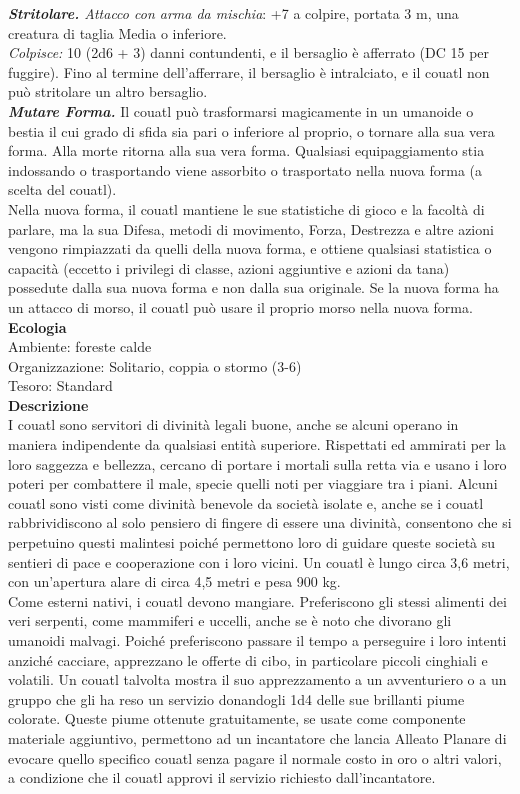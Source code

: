 \begin{multicols}{2}
\emph{\textbf{Stritolare.} Attacco con arma da mischia}: +7 a colpire, portata 3 m, una creatura di taglia Media o inferiore.\\
\emph{Colpisce:} 10 (2d6 + 3) danni contundenti, e il bersaglio è afferrato (DC 15 per fuggire). Fino al termine dell'afferrare, il bersaglio è intralciato, e il couatl non può stritolare un altro bersaglio.\\
\emph{\textbf{Mutare Forma.}} Il couatl può trasformarsi magicamente in un umanoide o bestia il cui grado di sfida sia pari o inferiore al proprio, o tornare alla sua vera forma. Alla morte ritorna alla sua vera forma. Qualsiasi equipaggiamento stia indossando o trasportando viene assorbito o trasportato nella nuova forma (a scelta del couatl).\\
Nella nuova forma, il couatl mantiene le sue statistiche di gioco e la facoltà di parlare, ma la sua Difesa, metodi di movimento, Forza, Destrezza e altre azioni vengono rimpiazzati da quelli della nuova forma, e ottiene qualsiasi statistica o capacità (eccetto i privilegi di classe, azioni aggiuntive e azioni da tana) possedute dalla sua nuova forma e non dalla sua originale. Se la nuova forma ha un attacco di morso, il couatl può usare il proprio morso nella nuova forma.\\
\textbf{Ecologia}\\
Ambiente: foreste calde\\
Organizzazione: Solitario, coppia o stormo (3-6)\\
Tesoro: Standard\\
\textbf{Descrizione}\\
I couatl sono servitori di divinità legali buone, anche se alcuni operano in maniera indipendente da qualsiasi entità superiore. Rispettati ed ammirati per la loro saggezza e bellezza, cercano di portare i mortali sulla retta via e usano i loro poteri per combattere il male, specie quelli noti per viaggiare tra i piani. Alcuni couatl sono visti come divinità benevole da società isolate e, anche se i couatl rabbrividiscono al solo pensiero di fingere di essere una divinità, consentono che si perpetuino questi malintesi poiché permettono loro di guidare queste società su sentieri di pace e cooperazione con i loro vicini. Un couatl è lungo circa 3,6 metri, con un’apertura alare di circa 4,5 metri e pesa 900 kg.\\
Come esterni nativi, i couatl devono mangiare. Preferiscono gli stessi alimenti dei veri serpenti, come mammiferi e uccelli, anche se è noto che divorano gli umanoidi malvagi. Poiché preferiscono passare il tempo a perseguire i loro intenti anziché cacciare, apprezzano le offerte di cibo, in particolare piccoli cinghiali e volatili. Un couatl talvolta mostra il suo apprezzamento a un avventuriero o a un gruppo che gli ha reso un servizio donandogli 1d4 delle sue brillanti piume colorate. Queste piume ottenute gratuitamente, se usate come componente materiale aggiuntivo, permettono ad un incantatore che lancia Alleato Planare di evocare quello specifico couatl senza pagare il normale costo in oro o altri valori, a condizione che il couatl approvi il servizio richiesto dall’incantatore.\\


\end{multicols}
